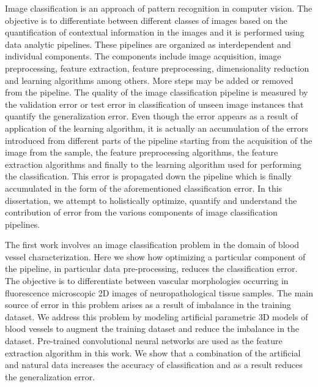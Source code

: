 
Image classification is an approach of pattern recognition in computer vision. The objective is to differentiate between different classes of images based on the quantification of contextual information in the images and it is performed using data analytic pipelines. These pipelines are organized as interdependent and individual components. The components include image acquisition, image preprocessing, feature extraction, feature preprocessing, dimensionality reduction and learning algorithms among others. More steps may be added or removed from the pipeline. The quality of the image classification pipeline is measured by the validation error or test error in classification of unseen image instances that quantify the generalization error. Even though the error appears as a result of application of the learning algorithm, it is actually an accumulation of the errors introduced from different parts of the pipeline starting from the acquisition of the image from the sample, the feature preprocessing algorithms, the feature extraction algorithms and finally to the learning algorithm used for performing the  classification. This error is propagated down the pipeline which is finally accumulated in the form of the aforementioned classification error. In this dissertation, we attempt to holistically optimize, quantify and understand the contribution of error from the various components of image classification pipelines.   


The first work involves an image classification problem in the domain of blood vessel characterization. Here we show how optimizing a particular component of the pipeline, in particular data pre-processing, reduces the classification error. The objective is to differentiate between vascular morphologies occurring in fluorescence microscopic 2D images of neuropathological tissue samples. The main source of error in this problem arises as a result of imbalance in the training dataset. We address this problem by modeling artificial parametric 3D models of blood vessels to augment the training dataset and reduce the imbalance in the dataset. Pre-trained convolutional neural networks are used as the feature extraction algorithm in this work. We show that a combination of the artificial and natural data increases the accuracy of classification and as a result reduces the generalization error.

